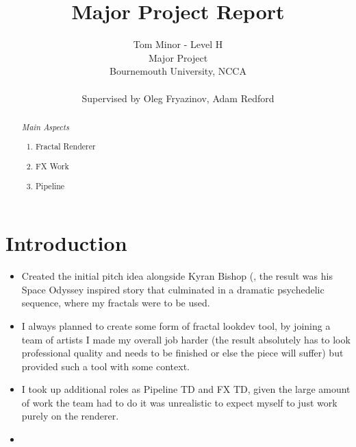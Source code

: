 \documentclass[11pt,a4paper,final,notitlepage]{report}
\makeatletter
\newcommand*{\toccontents}{\@starttoc{toc}}
\newcommand\Lenny{(\scalerel{\stackanchor[2pt]{\eye \nose \eye}{\mouth}}{)}}
\makeatother
\begin{document}
\title{ Major Project Report }

\author{ Tom Minor - Level H\\
 		 Major Project\\
 		 Bournemouth University, NCCA\\
 		 \\
 		 Supervised by Oleg Fryazinov, Adam Redford
		}

\date{}
\maketitle

\renewcommand{\abstractname}{Project Overview 
\\We have crazy integration, crazy asset production, crazy pipeline and our own GPU renderer - that's quite cool when you put it that way \Lenny{} }
\begin{abstract}

\textit{Main Aspects}
\begin{enumerate}
\item Fractal Renderer
\item FX Work
\item Pipeline
\end{enumerate}

\end{abstract}

\toccontents

\chapter{Introduction}

\begin{itemize}
	\item Created the initial pitch idea alongside Kyran Bishop \Lenny{}, the result was his Space Odyssey inspired story that culminated in a dramatic psychedelic sequence, where my fractals were to be used. 
	\item I always planned to create some form of fractal lookdev tool, by joining a team of artists I made my overall job harder (the result absolutely has to look professional quality and needs to be finished or else the piece will suffer) but provided such a tool with some context.
	\item I took up additional roles as Pipeline TD and FX TD, given the large amount of work the team had to do it was unrealistic to expect myself to just work purely on the renderer.
	\item <Explain report overview>
\end{itemize}
\end{document}
